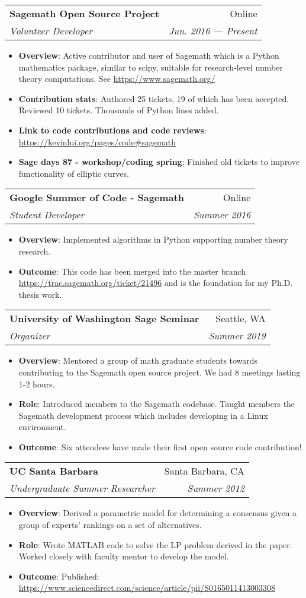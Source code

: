 \documentclass[letterpaper,10pt]{article}
\makeatletter
\newcommand{\resumeItem}[2]{
  \item\small{
    \textbf{#1}{: #2 \vspace{-2pt}}
  }
}
\newcommand{\resumeSubheading}[4]{
  \vspace{-1pt}\item
    \begin{tabular*}{0.97\textwidth}[t]{l@{\extracolsep{\fill}}r}
      \textbf{#1} & #2 \\
      \textit{\small#3} & \textit{\small #4} \\
    \end{tabular*}\vspace{-5pt}
}
\newcommand{\resumeItemListStart}{\begin{itemize}}
\newcommand{\resumeItemListEnd}{\end{itemize}\vspace{-5pt}}
\makeatother
\begin{document}
\resumeSubheading
{Sagemath Open Source Project}{Online}
{Volunteer Developer}{Jun. 2016 --- Present}
\resumeItemListStart
\resumeItem{Overview}
{Active contributor and user of Sagemath which is a Python mathematics
package, similar to scipy, suitable for research-level number theory
computations. See \url{https://www.sagemath.org/}}
\resumeItem{Contribution stats}{Authored 25 tickets, 19 of which has been
accepted. Reviewed 10 tickets. Thousands of Python lines added.}
\resumeItem{Link to
code contributions and code reviews}{\url{https://kevinlui.org/pages/code\#sagemath}}
\resumeItem{Sage days 87 - workshop/coding spring}{Finished old tickets to
improve functionality of elliptic curves.}
\resumeItemListEnd

\resumeSubheading
{Google Summer of Code - Sagemath}{Online}
{Student Developer}{Summer 2016}
\resumeItemListStart
\resumeItem{Overview}
{Implemented algorithms in Python supporting number theory research.}
\resumeItem{Outcome}{This code has been merged into the master branch
\url{https://trac.sagemath.org/ticket/21496} and is the foundation for my Ph.D.
thesis work.}
\resumeItemListEnd


\resumeSubheading
{University of Washington Sage Seminar}{Seattle, WA}
{Organizer}{Summer 2019}
\resumeItemListStart
\resumeItem{Overview}{Mentored a group of math graduate students towards
contributing to the Sagemath open source project. We had 8 meetings lasting
1-2 hours.}
\resumeItem{Role}{Introduced members to the Sagemath codebase. Taught
members the Sagemath development process which includes developing in a Linux
environment.}
\resumeItem{Outcome}{Six attendees have made their first open source code
contribution!}
\resumeItemListEnd

\resumeSubheading
{UC Santa Barbara}{Santa Barbara, CA}
{Undergraduate Summer Researcher}{Summer 2012}
\resumeItemListStart
\resumeItem{Overview}{Derived a parametric model for determining a consensus
given a group of experts' rankings on a set of alternatives.}
\resumeItem{Role}{Wrote MATLAB code to solve the LP problem derived in the
paper. Worked closely with faculty mentor to develop the model.}
\resumeItem{Outcome}{Published:
\url{https://www.sciencedirect.com/science/article/pii/S0165011413003308}}
\resumeItemListEnd

\end{document}
